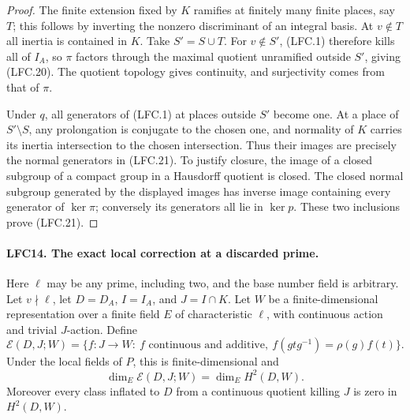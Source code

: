 \begin{proof}
The finite extension fixed by \(K\) ramifies at finitely
many finite places, say \(T\); this follows by inverting
the nonzero discriminant of an integral basis.
At \(v\notin T\) all inertia is contained in \(K\).
Take \(S'=S\cup T\).
For \(v\notin S'\), (LFC.1) therefore kills all of \(I_A\),
so \(\pi\) factors through the maximal quotient
unramified outside \(S'\), giving (LFC.20).
The quotient topology gives continuity, and surjectivity
comes from that of \(\pi\).

Under \(q\), all generators of (LFC.1) at places outside
\(S'\) become one.  At a place of \(S'\setminus S\),
any prolongation is conjugate to the chosen one, and
normality of \(K\) carries its inertia intersection to
the chosen intersection.  Thus their images are precisely
the normal generators in (LFC.21).
To justify closure, the image of a closed subgroup of a
compact group in a Hausdorff quotient is closed.
The closed normal subgroup generated by the displayed
images has inverse image containing every generator
of \(\ker\pi\); conversely its generators all lie in
\(\ker p\).  These two inclusions prove (LFC.21).
\end{proof}

\paragraph{LFC14. The exact local correction at a discarded prime.}
\label{claim:LFC14}
Here \(\ell\) may be any prime, including two, and the
base number field is arbitrary.
Let \(v\nmid\ell\), let \(D=D_A\), \(I=I_A\), and
\(J=I\cap K\).  Let \(W\) be a finite-dimensional
representation over a finite field \(E\) of characteristic
\(\ell\), with continuous action and trivial \(J\)-action.
Define
\[
 \mathcal E(D,J;W)=
 \{f:J\to W:\ f\text{ continuous and additive},\
                     f(g t g^{-1})=\rho(g)f(t)\}.
 \]
Under the local fields of \(P\), this is finite-dimensional and
\[
              \dim_E\mathcal E(D,J;W)=\dim_E H^2(D,W).
                                                        \tag{LFC.22}
\]
Moreover every class inflated to \(D\) from a continuous
quotient killing \(J\) is zero in \(H^2(D,W)\).

